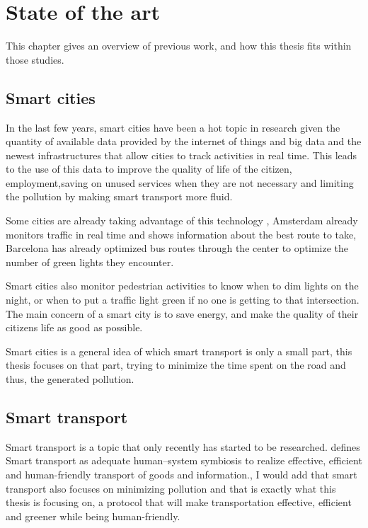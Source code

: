\chapter{State of the art}
\label{ch:stateoftheart}

This chapter gives an overview of previous work, and how this thesis fits within those studies.

\section{Smart cities}

In the last few years, smart cities have been a hot topic in research \cite{caragliu_bo_nijkamp_2011} given the quantity of available data provided by the internet of things \cite{zanella_bui_castellani_vangelista_zorzi_2014} and big data \cite{townsend_2013} and the newest infrastructures that allow cities to track activities in real time. This leads to the use of this data to improve the quality of life of the citizen, employment\cite{shapiro_2005},saving on unused services when they are not necessary and limiting the pollution by making smart transport more fluid.

Some cities are already taking advantage of this technology \cite{wikipedia_smart_cities}, Amsterdam already monitors traffic in real time and shows information about the best route to take, Barcelona has already optimized bus routes through the center to optimize the number of green lights they encounter.

Smart cities also monitor pedestrian activities to know when to dim lights on the night, or when to put a traffic light green if no one is getting to that intersection. The main concern of a smart city is to save energy, and make the quality of their citizens life as good as possible.

Smart cities is a general idea of which smart transport is only a small part, this thesis focuses on that part, trying to minimize the time spent on the road and thus, the generated pollution.

\section{Smart transport}

Smart transport is a topic that only recently has started to be researched. \cite{lenior_janssen_neerincx_schreibers_2006} defines Smart transport as \glqq adequate human–system symbiosis to realize effective, efficient and human-friendly transport of goods and information.\grqq, I would add that smart transport also focuses on minimizing pollution and that is exactly what this thesis is focusing on, a protocol that will make transportation effective, efficient and greener while being human-friendly.

